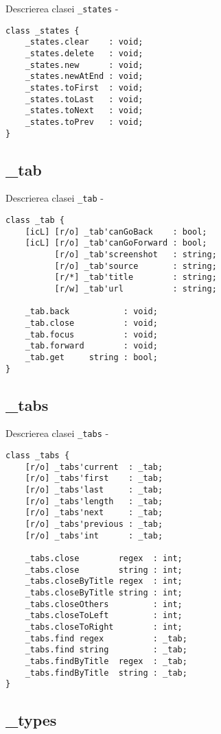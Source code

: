 \noindent Descrierea clasei \texttt{\_states} -
\begin{verbatim}
class _states {
	_states.clear    : void;
	_states.delete   : void;
	_states.new      : void;
	_states.newAtEnd : void;
	_states.toFirst  : void;
	_states.toLast   : void;
	_states.toNext   : void;
	_states.toPrev   : void;
}
\end{verbatim}

\subsection{{\color{orange} \_tab}}

\noindent Descrierea clasei \texttt{\_tab} -
\begin{verbatim}
class _tab {
	[icL] [r/o] _tab'canGoBack    : bool;
	[icL] [r/o] _tab'canGoForward : bool;
	      [r/o] _tab'screenshot   : string;
	      [r/o] _tab'source       : string;
	      [r/*] _tab'title        : string;
	      [r/w] _tab'url          : string;

	_tab.back           : void;
	_tab.close          : void;
	_tab.focus          : void;
	_tab.forward        : void;
	_tab.get     string : bool;
}
\end{verbatim}

\subsection{{\color{orange} \_tabs}}

\noindent Descrierea clasei \texttt{\_tabs} -
\begin{verbatim}
class _tabs {
	[r/o] _tabs'current  : _tab;
	[r/o] _tabs'first    : _tab;
	[r/o] _tabs'last     : _tab;
	[r/o] _tabs'length   : _tab;
	[r/o] _tabs'next     : _tab;
	[r/o] _tabs'previous : _tab;
	[r/o] _tabs'int      : _tab;
	
	_tabs.close        regex  : int;
	_tabs.close        string : int;
	_tabs.closeByTitle regex  : int;
	_tabs.closeByTitle string : int;
	_tabs.closeOthers         : int;
	_tabs.closeToLeft         : int;
	_tabs.closeToRight        : int;
	_tabs.find regex          : _tab;
	_tabs.find string         : _tab;
	_tabs.findByTitle  regex  : _tab;
	_tabs.findByTitle  string : _tab;
}
\end{verbatim}

\subsection{{\color{orange} \_types}}

